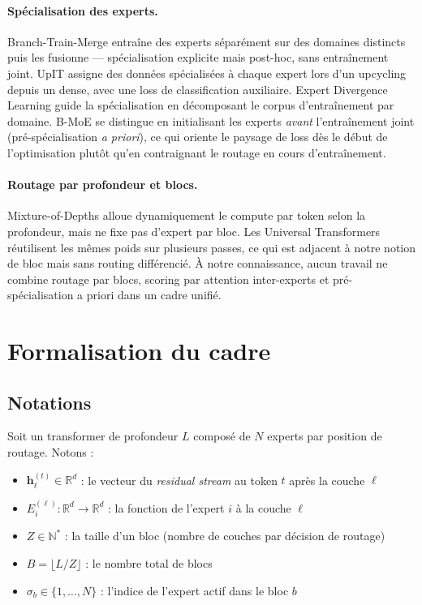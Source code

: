 \documentclass[10pt,a4paper]{article}
\begin{document}
\paragraph{Spécialisation des experts.}
Branch-Train-Merge \cite{li2022btm} entraîne des experts séparément sur des domaines distincts puis les fusionne — spécialisation explicite mais post-hoc, sans entraînement joint. UpIT \cite{upit2025} assigne des données spécialisées à chaque expert lors d'un upcycling depuis un dense, avec une loss de classification auxiliaire. Expert Divergence Learning \cite{edl2026} guide la spécialisation en décomposant le corpus d'entraînement par domaine. B-MoE se distingue en initialisant les experts \textit{avant} l'entraînement joint (pré-spécialisation \textit{a priori}), ce qui oriente le paysage de loss dès le début de l'optimisation plutôt qu'en contraignant le routage en cours d'entraînement.

\paragraph{Routage par profondeur et blocs.}
Mixture-of-Depths \cite{raposo2024mod} alloue dynamiquement le compute par token selon la profondeur, mais ne fixe pas d'expert par bloc. Les Universal Transformers \cite{dehghani2019universal} réutilisent les mêmes poids sur plusieurs passes, ce qui est adjacent à notre notion de bloc mais sans routing différencié. À notre connaissance, aucun travail ne combine routage par blocs, scoring par attention inter-experts et pré-spécialisation a priori dans un cadre unifié.

\section{Formalisation du cadre}

\subsection{Notations}

Soit un transformer de profondeur $L$ composé de $N$ experts par position de routage. Notons :
\begin{itemize}
  \item $\mathbf{h}_\ell^{(t)} \in \mathbb{R}^d$ : le vecteur du \textit{residual stream} au token $t$ après la couche $\ell$
  \item $E_i^{(\ell)} : \mathbb{R}^d \to \mathbb{R}^d$ : la fonction de l'expert $i$ à la couche $\ell$
  \item $Z \in \mathbb{N}^*$ : la taille d'un bloc (nombre de couches par décision de routage)
  \item $B = \lfloor L/Z \rfloor$ : le nombre total de blocs
  \item $\sigma_b \in \{1, \ldots, N\}$ : l'indice de l'expert actif dans le bloc $b$
\end{itemize}
\end{document}
